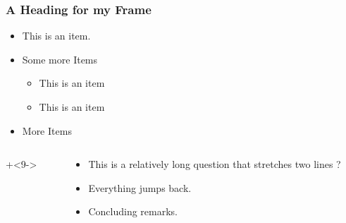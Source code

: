 \documentclass[12pt]{beamer}
\begin{document}
\begin{frame} \footnotesize
\frametitle{A Heading for my Frame}

\begin{itemize}
    \item This is an item.
\end{itemize}

\begin{overlayarea}{\textwidth}{.9\textheight}

\begin{itemize}
    \item Some more Items
    \begin{itemize}
        \item<2-> This is an item
        \item<5-> This is an item
    \end{itemize}%

    \item<8-> More Items
\end{itemize}
\begin{columns}[T]
    \begin{column}{.15\textwidth}
        \onslide+<9->{
            }%
    \end{column}
    \begin{column}{.6\textwidth}
        \begin{itemize} 
            \item<10-> This is a relatively long question that stretches two lines ?

            \item<13-> Everything jumps back.
            \item<14-> Concluding remarks.
        \end{itemize}


\end{column}
\end{columns}
\end{overlayarea}
\end{frame}
\end{document}
